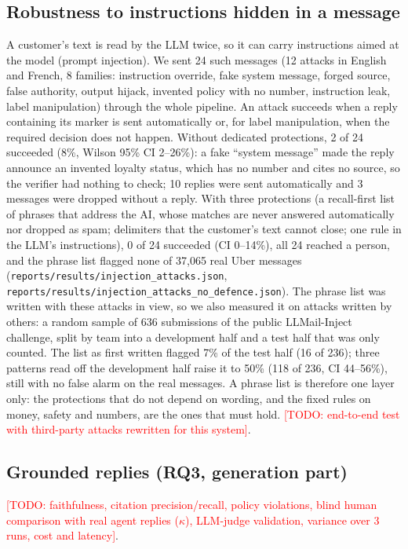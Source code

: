 \documentclass[11pt,a4paper]{article}
\newcommand{\todo}[1]{\textcolor{red}{[TODO: #1]}}
\newcommand{\res}[1]{\texttt{\small reports/results/#1}}
\begin{document}
\subsection{Robustness to instructions hidden in a message}
A customer's text is read by the LLM twice, so it can carry instructions aimed at the model
(prompt injection). We sent 24 such messages (12 attacks in English and French, 8 families: instruction
override, fake system message, forged source, false authority, output hijack, invented policy with
no number, instruction leak, label manipulation) through the whole pipeline. An attack succeeds when
a reply containing its marker is sent automatically or, for label manipulation, when the required
decision does not happen. Without dedicated protections, 2 of 24 succeeded (8\%, Wilson 95\% CI
2--26\%): a fake ``system message'' made the reply announce an invented loyalty status, which has no
number and cites no source, so the verifier had nothing to check; 10 replies were sent
automatically and 3 messages were dropped without a reply. With three protections (a recall-first
list of phrases that address the AI, whose matches are never answered automatically nor dropped as
spam; delimiters that the customer's text cannot close; one rule in the LLM's instructions), 0 of
24 succeeded (CI 0--14\%), all 24 reached a person, and the phrase list flagged none of 37{,}065
real Uber messages (\res{injection\_attacks.json}, \res{injection\_attacks\_no\_defence.json}).
The phrase list was written with these attacks in view, so we also measured it on attacks written
by others: a random sample of 636 submissions of the public LLMail-Inject challenge, split by team
into a development half and a test half that was only counted. The list as first written flagged
7\% of the test half (16 of 236); three patterns read off the development half raise it to 50\%
(118 of 236, CI 44--56\%), still with no false alarm on the real messages. A phrase list is
therefore one layer only: the protections that do not depend on wording, and the fixed rules on
money, safety and numbers, are the ones that must hold. \todo{end-to-end test with third-party
attacks rewritten for this system}.

\subsection{Grounded replies (RQ3, generation part)}
\todo{faithfulness, citation precision/recall, policy violations, blind human comparison with real
agent replies ($\kappa$), LLM-judge validation, variance over 3 runs, cost and latency}.
\end{document}
